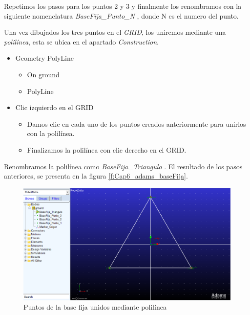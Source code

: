         Repetimos los pasos para los puntos 2 y 3 y finalmente los renombramos con la siguiente nomenclatura \textit{BaseFija\_Punto\_N} , donde N es el numero del punto.
        
        Una vez  dibujados los tres puntos en el \textit{GRID}, los uniremos mediante una \textit{polilínea}, esta se ubica en el apartado \textit{Construction}.
        
        \begin{scope}
            \renewcommand{\labelitemi}{\blacklozenge}
            \renewcommand{\labelitemii}{\checkmark}
            \begin{itemize}
                \item Geometry PolyLine
                \begin{itemize}
                    \item On ground 
                    \item PolyLine
                \end{itemize}
                \item Clic izquierdo en el GRID
                \begin{itemize}
                    \item Damos clic en cada uno de los puntos creados anteriormente para unirlos con la polilínea.
                    \item Finalizamos la polilínea con clic derecho en el GRID.
                \end{itemize}
            \end{itemize}
        \end{scope}
        
        Renombramos la polilínea como \textit{BaseFija\_Triangulo} . El resultado de los pasos anteriores, se presenta en la figura \eqref{f:Cap6_adams_baseFija}.
        
        \begin{figure}[H]
            \centering
            \includegraphics[width=1\linewidth]{Main/Chapter6/Images6/adams/base-fija/baseFija.png}
            \caption{Puntos de la base fija unidos mediante polilínea}
            \label{f:Cap6_adams_baseFija}
        \end{figure}
        
